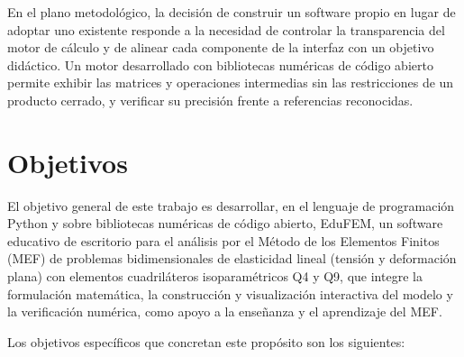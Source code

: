 En el plano metodológico, la decisión de construir un software propio en lugar de adoptar uno existente responde a la necesidad de controlar la transparencia del motor de cálculo y de alinear cada componente de la interfaz con un objetivo didáctico. Un motor desarrollado con bibliotecas numéricas de código abierto \autocite{harris2020numpy,virtanen2020scipy} permite exhibir las matrices y operaciones intermedias sin las restricciones de un producto cerrado, y verificar su precisión frente a referencias reconocidas.

\section*{Objetivos}

El objetivo general de este trabajo es desarrollar, en el lenguaje de programación Python y sobre bibliotecas numéricas de código abierto, EduFEM, un software educativo de escritorio para el análisis por el Método de los Elementos Finitos (MEF) de problemas bidimensionales de elasticidad lineal (tensión y deformación plana) con elementos cuadriláteros isoparamétricos Q4 y Q9, que integre la formulación matemática, la construcción y visualización interactiva del modelo y la verificación numérica, como apoyo a la enseñanza y el aprendizaje del MEF.

Los objetivos específicos que concretan este propósito son los siguientes:

